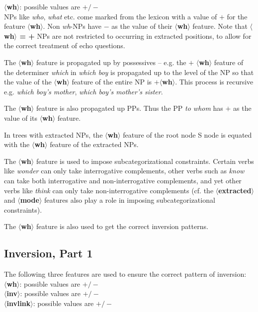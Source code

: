 \noindent
{\bf $\langle$wh$\rangle$}: possible values are {\bf $+/-$}\\ NPs like
{\em who}, {\em what} etc. come marked from the lexicon with a value
of {\bf $+$} for the feature {\bf $\langle$wh$\rangle$}.  Non {\em
wh}-NPs have {\bf $-$} as the value of their {\bf
$\langle$wh$\rangle$} feature. Note that {\bf $\langle$wh$\rangle$ = +
} NPs are not restricted to occurring in extracted positions, to allow
for the correct treatment of echo questions.

The {\bf $\langle$wh$\rangle$} feature is propagated up by possessives
-- e.g. the $+$ {\bf $\langle$wh$\rangle$} feature of the determiner
{\em which} in {\em which boy} is propagated up to the level of the NP
so that the value of the {\bf $\langle$wh$\rangle$} feature of the
entire NP is $+${\bf $\langle$wh$\rangle$}. This process is recursive
e.g. {\em which boy's mother}, {\em which boy's mother's sister}.

The {\bf $\langle$wh$\rangle$} feature
is also propagated up PPs. Thus the PP {\em to whom} has $+$ as the value of its 
{\bf $\langle$wh$\rangle$} feature. 

In trees with extracted NPs, the {\bf $\langle$wh$\rangle$} feature of the
root node S node is equated with the {\bf $\langle$wh$\rangle$} feature
of the extracted NPs. 

The {\bf $\langle$wh$\rangle$} feature is used to impose
subcategorizational constraints.
Certain verbs like {\em wonder} can
only take interrogative complements, other verbs such as {\em know}
can take both interrogative and non-interrogative complements, and yet
other verbs like {\em think} can only take non-interrogative
complements (cf. the {\bf $\langle$extracted$\rangle$} and {\bf
$\langle$mode$\rangle$} features also play a role in imposing 
subcategorizational constraints).

The {\bf $\langle$wh$\rangle$} feature is also used to get the correct
inversion patterns.


\subsection{Inversion, Part 1}
The following three features are used to ensure the correct pattern of
inversion:\\
{\bf $\langle$wh$\rangle$}: possible values are {\bf $+/-$}\\
{\bf $\langle$inv$\rangle$}: possible values are {\bf $+/-$}\\
{\bf $\langle$invlink$\rangle$}: possible values are {\bf $+/-$}

